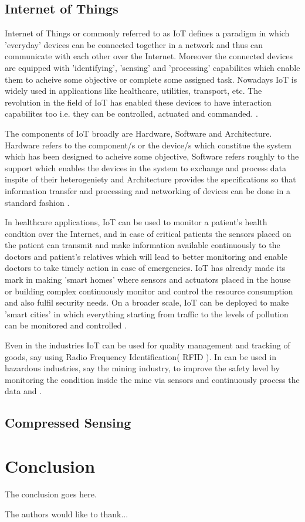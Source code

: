 \documentclass[12pt]{article}
\begin{document}
  \subsection{Internet of Things}
  Internet of Things or commonly referred to as IoT defines a paradigm in which 'everyday' devices can be connected 
  together in a network and thus can communicate with each other over the Internet. Moreover the connected devices are equipped 
  with 'identifying', 'sensing' and 'processing' \cite{Whitmore-survey}
  capabilites which enable them to 
  acheive some objective or complete some assigned task. Nowadays IoT is widely used in applications like
  healthcare, utilities, transport, etc. The revolution in the field of IoT has enabled
  these devices to have interaction capabilites too i.e. they can be controlled, actuated and commanded.
  \cite{Gubbi-vision}. 
  \par The components of IoT broadly are Hardware, Software and Architecture. Hardware refers to the component/s
  or the device/s which constitue the system which has been designed to acheive some objective, Software refers roughly
  to the support which enables the devices in the system to exchange and process data inspite of their heterogeniety 
   and Architecture provides the specifications so that information transfer and processing
   and networking of devices can be done in a standard fashion  \cite{Whitmore-survey} \cite{Gubbi-vision}.
  \par In healthcare applications, IoT can be used to monitor a patient's health condtion over the Internet, and 
  in case of critical patients the sensors placed on the patient can transmit and make information available continuously
  to the doctors and patient's relatives which will lead to better monitoring and enable doctors to take timely action
  in case of emergencies. IoT has already made its mark in making 'smart homes' where sensors and actuators placed in 
  the house or building complex continuously monitor and control the resource consumption and also fulfil security needs.
  On a broader scale, IoT can be deployed to make 'smart cities' in which everything starting from traffic to the levels 
  of pollution can be monitored and controlled \cite{Whitmore-survey}. 
  \par Even in the industries IoT can be used for quality management and tracking of goods, say using Radio Frequency
  Identification( RFID ). In can be used in hazardous industries, say the mining industry, to improve the safety level
  by monitoring the condition inside the mine via sensors and continuously process the data and .
  \subsection{Compressed Sensing}

\section{Conclusion}
The conclusion goes here.

The authors would like to thank...\cite{Whitmore-survey} \cite{Huang-DGS}





\end{document}
